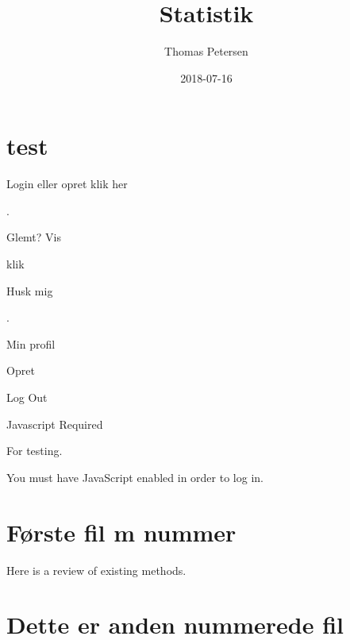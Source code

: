 \documentclass[]{book}
\title{Statistik}
\author{Thomas Petersen}
\date{2018-07-16}
\theoremstyle{definition}
\theoremstyle{definition}
\theoremstyle{definition}
\theoremstyle{remark}
\begin{document}
\maketitle

{
\setcounter{tocdepth}{1}
\tableofcontents
}
\hypertarget{test}{%
\chapter*{test}\label{test}}

\hypertarget{Settings}{}

\hypertarget{TopBar}{}
\hypertarget{Sentry_label}{}
\protect\hypertarget{Sentry_label_span}{}{Login eller opret klik her}

\hypertarget{magicGroup}{}
\hypertarget{messages}{}
.

\hypertarget{Sentry_emailDiv}{}
{ }

\hypertarget{Sentry_passwordDiv}{}
{ }

\hypertarget{Sentry_HIDpasswordDiv}{}
{ }

\hypertarget{unHideDiv}{}
\protect\hypertarget{forgotSpan}{}{Glemt?}
\protect\hypertarget{unHideSpan}{}{Vis}

\hypertarget{buttonDiv}{}
klik

\hypertarget{psistDiv}{}
 \protect\hypertarget{psistSpan}{}{Husk mig}

\hypertarget{goInside}{}
\protect\hypertarget{goInsideSpan}{}{.}

\hypertarget{myProfile}{}
Min profil

\hypertarget{Tilmeld}{}
Opret

\hypertarget{logOut}{}
{Log Out}

\hypertarget{xbox}{}

\hypertarget{Sentry_noJSLogin}{}
{Javascript Required}

\hypertarget{Sentry_loggingIn}{}

\hypertarget{Sentry_In}{}
For testing.

You must have JavaScript enabled in order to log in.

\hypertarget{frste-fil-m-nummer}{%
\chapter{Første fil m nummer}\label{frste-fil-m-nummer}}

Here is a review of existing methods.

\hypertarget{dette-er-anden-nummerede-fil}{%
\chapter{Dette er anden nummerede
fil}\label{dette-er-anden-nummerede-fil}}
\end{document}
